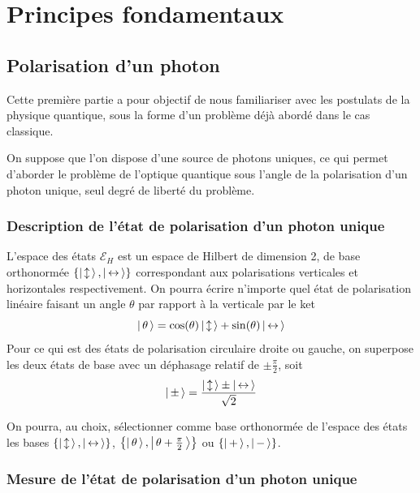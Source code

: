\section{Principes fondamentaux}

    \subsection{Polarisation d’un photon}

    Cette première partie a pour objectif de nous familiariser avec les postulats de la physique quantique, sous la forme d’un problème déjà abordé dans le cas classique.

    On suppose que l’on dispose d’une source de photons uniques, ce qui permet d’aborder le problème de l’optique quantique sous l’angle de la polarisation d’un photon unique, seul degré de liberté du problème. 

        \subsubsection{Description de l’état de polarisation d’un photon unique}

        L’espace des états $\mathcal{E}_H$ est un espace de Hilbert de dimension 2, de base orthonormée $\left\{\left| \, \updownarrow \, \right>, \left| \, \leftrightarrow \, \right>\right\}$ correspondant aux polarisations verticales et horizontales respectivement. On pourra écrire n’importe quel état de polarisation linéaire faisant un angle $\theta$ par rapport à la verticale par le ket 
        \[ \left| \, \theta \, \right> = \cos(\theta) \left| \, \updownarrow \, \right> + \sin(\theta) \left| \, \leftrightarrow \, \right> \]   
        Pour ce qui est des états de polarisation circulaire droite ou gauche, on superpose les deux états de base avec un déphasage relatif de $\pm \frac{\pi}{2}$, soit 
        \[ \left| \, \pm \, \right> = \frac{\left| \, \updownarrow \, \right> \pm \left| \, \leftrightarrow \, \right>}{\sqrt{2}} \]

        On pourra, au choix, sélectionner comme base orthonormée de l’espace des états les bases $\left\{\left| \, \updownarrow \, \right>, \left| \, \leftrightarrow \, \right>\right\}$, $\left\{\left| \, \theta \, \right>, \left| \, \theta + \frac{\pi}{2} \, \right>\right\}$ ou $\left\{\left| \, + \, \right>, \left| \, - \, \right>\right\}$.

        \subsubsection{Mesure de l’état de polarisation d’un photon unique}

